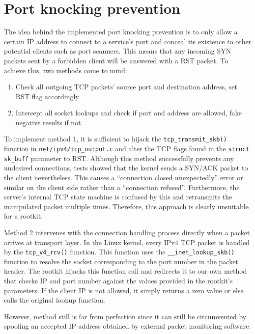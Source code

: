 \section{Port knocking prevention}
The idea behind the implemented port knocking prevention is to only allow a certain
IP address to connect to a service's port and conceal its existence to other potential clients such as port scanners. 
This means that any incoming SYN packets sent by a forbidden client will be answered with a RST packet. To achieve this,
two methods come to mind:
\begin{enumerate}
 \item Check all outgoing TCP packets' source port and destination address, set RST flag accordingly
 \item Intercept all socket lookups and check if port and address are allowed, fake negative results if not.
\end{enumerate}
To implement method 1, it is sufficient to hijack the 
\verb+tcp_transmit_skb()+ function in \verb+net/ipv4/tcp_output.c+ and alter the TCP flags found in the \verb+struct sk_buff+
parameter to RST. Although this method successfully prevents any undesired connections, tests showed that the kernel sends a SYN/ACK
packet to the client nevertheless. This causes a ``connection closed unexpectedly'' error or similar on the client side rather than a
``connection refused''. Furthermore, the server's internal TCP state machine is confused by this and retransmits the manipulated packet
multiple times. Therefore, this approach is clearly unsuitable for a rootkit. \par
Method 2 intervenes with the connection handling process directly when a packet arrives at transport layer.
In the Linux kernel, every IPv4 TCP packet is handled by the \texttt{tcp\_v4\_rcv()} function. This 
function uses the \texttt{\_\_inet\_lookup\_skb()} function to resolve the socket 
corresponding to the port number in the packet header. The rootkit hijacks this function call and
redirects it to our own method that checks IP and port number against the values provided in the rootkit's parameters. If the client IP
is not allowed, it simply returns a zero value or else calls the original lookup function.\par
However, method still is far from perfection since it can still be circumvented by spoofing an accepted IP address obtained by external packet monitoring software.
